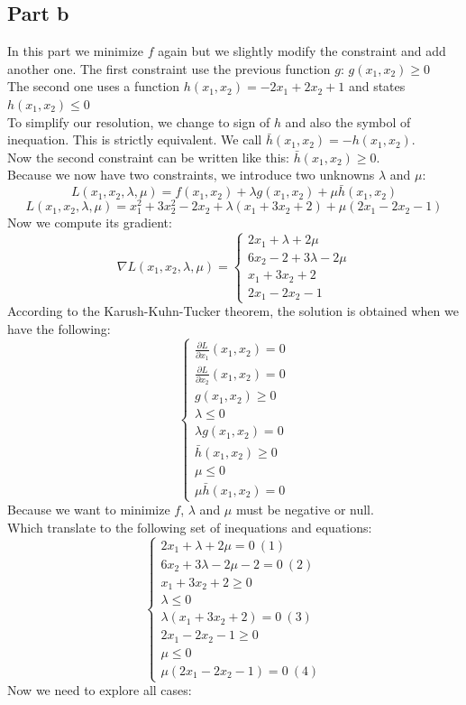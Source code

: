 \documentclass[a4paper, 10pt]{article}
\begin{document}
\subsection{Part b}
In this part we minimize $f$ again but we slightly modify the constraint and add another one.
The first constraint use the previous function $g$: $g(x_1,x_2)\geq 0$\\
The second one uses a function $h(x_1,x_2)=-2x_1+2x_2+1$ and states $h(x_1,x_2)\leq0$
\\
To simplify our resolution, we change to sign of $h$ and also the symbol of inequation. This is
strictly equivalent. We call $\bar{h}(x_1,x_2) = -h(x_1,x_2)$.
\\
Now the second constraint can be written like this: $\bar{h}(x_1,x_2)\geq0$.
\\
Because we now have two constraints, we introduce two unknowns $\lambda$ and $\mu$:
$$
L(x_1,x_2,\lambda,\mu) = f(x_1,x_2)+\lambda g(x_1,x_2)+\mu \bar{h}(x_1,x_2)
$$
$$
L(x_1,x_2,\lambda,\mu) = x_1^2+3x_2^2-2x_2 + \lambda (x_1+3x_2+2) + \mu(2x_1-2x_2-1)
$$
Now we compute its gradient:
$$
\nabla L(x_1,x_2,\lambda,\mu) = \left\{ \begin{array}{c}
    2x_1+\lambda+2\mu\\
    6x_2-2+3\lambda-2\mu\\
    x_1+3x_2+2\\
    2x_1-2x_2-1
\end{array}\right .
$$
According to the Karush-Kuhn-Tucker theorem, the solution is obtained when we have the following:
$$
\left\{ \begin{array}{c}
    \frac{\partial L}{\partial x_1}(x_1,x_2) = 0\\
    \frac{\partial L}{\partial x_2}(x_1,x_2) = 0\\
    g(x_1,x_2) \geq 0\\
    \lambda \leq 0\\
    \lambda g(x_1,x_2) = 0\\
    \bar{h}(x_1,x_2) \geq 0\\
    \mu \leq 0\\
    \mu \bar{h}(x_1,x_2) = 0
\end{array}\right.
$$
Because we want to minimize $f$, $\lambda$ and $\mu$ must be negative or null.
\\
Which translate to the following set of inequations and equations:
$$
\left\{ \begin{array}{c}
    2x_1+\lambda+2\mu = 0\ (1)\\
    6x_2+3\lambda-2\mu -2=0\ (2)\\
    x_1+3x_2+2 \geq 0\\
    \lambda \leq 0\\
    \lambda (x_1+3x_2+2) = 0\ (3)\\
    2x_1-2x_2-1 \geq 0\\
    \mu \leq 0\\
    \mu(2x_1-2x_2-1) = 0\ (4)
\end{array}\right.
$$
Now we need to explore all cases:
\\
\end{document}

